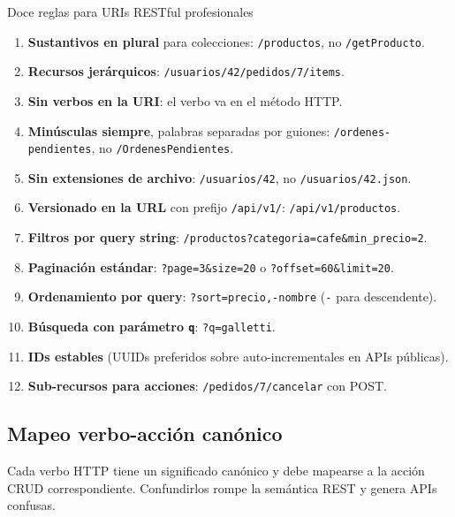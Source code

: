 \begin{cajabuenas}{Doce reglas para URIs RESTful profesionales}
\begin{enumerate}
\item \textbf{Sustantivos en plural} para colecciones:
\texttt{/productos}, no \texttt{/getProducto}.
\item \textbf{Recursos jerárquicos}:
\texttt{/usuarios/42/pedidos/7/items}.
\item \textbf{Sin verbos en la URI}: el verbo va en el método HTTP.
\item \textbf{Minúsculas siempre}, palabras separadas por guiones:
\texttt{/ordenes-pendientes}, no \texttt{/OrdenesPendientes}.
\item \textbf{Sin extensiones de archivo}: \texttt{/usuarios/42}, no
\texttt{/usuarios/42.json}.
\item \textbf{Versionado en la URL} con prefijo \texttt{/api/v1/}:
\texttt{/api/v1/productos}.
\item \textbf{Filtros por query string}:
\texttt{/productos?categoria=cafe\&min\_precio=2}.
\item \textbf{Paginación estándar}:
\texttt{?page=3\&size=20} o \texttt{?offset=60\&limit=20}.
\item \textbf{Ordenamiento por query}:
\texttt{?sort=precio,-nombre} (\texttt{-} para descendente).
\item \textbf{Búsqueda con parámetro \texttt{q}}:
\texttt{?q=galletti}.
\item \textbf{IDs estables} (UUIDs preferidos sobre auto-incrementales
en APIs públicas).
\item \textbf{Sub-recursos para acciones}: \texttt{/pedidos/7/cancelar}
con POST.
\end{enumerate}
\end{cajabuenas}

\subsection{Mapeo verbo-acción canónico}

Cada verbo HTTP tiene un significado canónico y debe
mapearse a la acción CRUD correspondiente. Confundirlos rompe la
semántica REST y genera APIs confusas.


